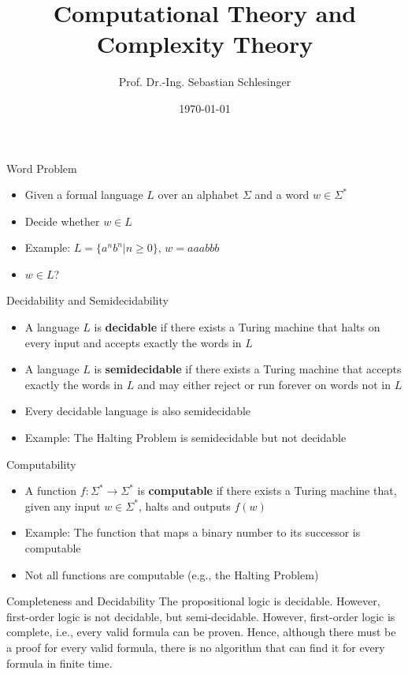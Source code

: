 \documentclass{beamer}
\title[Computational Theory and Complexity Theory]{Computational Theory and Complexity Theory}
\author[Sebastian Schlesinger]{Prof. Dr.-Ing. Sebastian Schlesinger}
\institute[HWR Berlin]{Berlin School for Economics and Law}
\date{\today}
\begin{document}
 \begin{frame}
\titlepage
\end{frame}



\begin{frame}{Word Problem}
\begin{itemize}
    \item Given a formal language $L$ over an alphabet $\Sigma$ and a word $w \in \Sigma^*$
    \item Decide whether $w \in L$
    \item Example: $L = \{a^n b^n | n \geq 0\}$, $w = aaabbb$
    \item $w \in L$?
\end{itemize}
\end{frame} 

\begin{frame}{Decidability and Semidecidability}
\begin{itemize}
    \item A language $L$ is \textbf{decidable} if there exists a Turing machine that halts on every input and accepts exactly the words in $L$
    \item A language $L$ is \textbf{semidecidable} if there exists a Turing machine that accepts exactly the words in $L$ and may either reject or run forever on words not in $L$
    \item Every decidable language is also semidecidable
    \item Example: The Halting Problem is semidecidable but not decidable
\end{itemize}
\end{frame}

\begin{frame}{Computability}
\begin{itemize}
    \item A function $f: \Sigma^* \rightarrow \Sigma^*$ is \textbf{computable} if there exists a Turing machine that, given any input $w \in \Sigma^*$, halts and outputs $f(w)$
    \item Example: The function that maps a binary number to its successor is computable
    \item Not all functions are computable (e.g., the Halting Problem)
\end{itemize}
\end{frame}

\begin{frame}{Completeness and Decidability}
 The propositional logic is decidable. However, first-order logic is not decidable, but semi-decidable.
 However, first-order logic is complete, i.e., every valid formula can be proven.
 Hence, although there must be a proof for every valid formula, there is no algorithm that can find it for every formula in finite time.
\end{frame}
\end{document}
